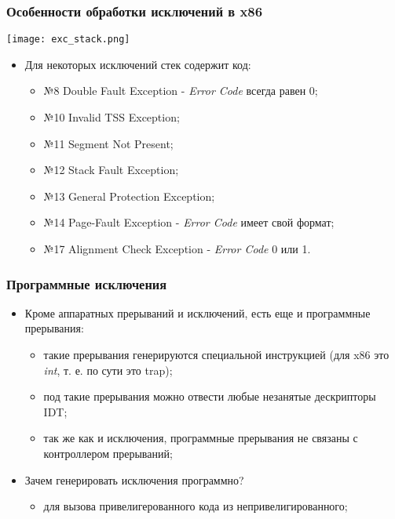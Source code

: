 \begin{frame}
\frametitle{Особенности обработки исключений в x86}
\begin{center}
  \texttt{[image: exc\_stack.png]}
\end{center}
\begin{itemize}
  \item Для некоторых исключений стек содержит код:
  \begin{itemize}
    \item №8 Double Fault Exception - \emph{Error Code} всегда равен 0;
    \item №10 Invalid TSS Exception;
    \item №11 Segment Not Present;
    \item №12 Stack Fault Exception;
    \item №13 General Protection Exception;
    \item №14 Page-Fault Exception - \emph{Error Code} имеет свой формат;
    \item №17 Alignment Check Exception - \emph{Error Code} 0 или 1.
  \end{itemize}
\end{itemize}
\end{frame}

\begin{frame}
\frametitle{Программные исключения}
\begin{itemize}
  \item Кроме аппаратных прерываний и исключений, есть еще и программные
  прерывания:
  \begin{itemize}
    \item такие прерывания генерируются специальной инструкцией (для x86 это
    \emph{int}, т. е. по сути это trap);
    \item под такие прерывания можно отвести любые незанятые дескрипторы IDT;
    \item так же как и исключения, программные прерывания не связаны с
    контроллером прерываний;
  \end{itemize}
  \item Зачем генерировать исключения программно?
  \begin{itemize}
    \item для вызова привелигерованного кода из непривелигированного;
  \end{itemize}
\end{itemize}
\end{frame}

